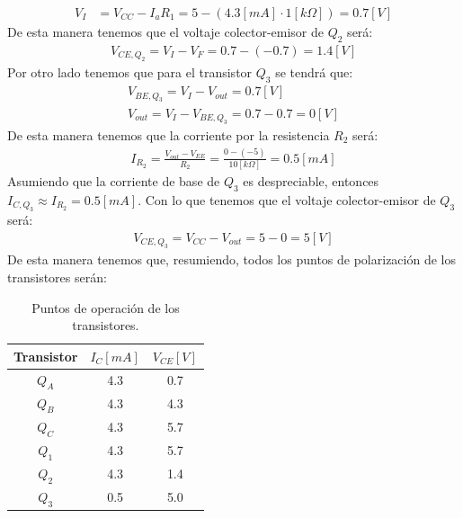 \documentclass[
  11pt,
  letterpaper,
   addpoints,
   answers
  ]{exam}
\begin{document}
\begin{questions}
\begin{parts}
\begin{solution}
\begin{align}
V_{I} &= V_{CC} - I_{a} R_{1} = 5 - (4.3[mA] \cdot 1[k\Omega]) = 0.7[V]
\end{align}
De esta manera tenemos que el voltaje colector-emisor de $Q_2$ será:
\begin{align}
  V_{CE,Q_2} = V_{I} - V_{F} = 0.7 - (-0.7) = 1.4[V]
\end{align}
Por otro lado tenemos que para el transistor $Q_{3}$ se tendrá que:
\begin{align}
  V_{BE,Q_3} = V_{I} - V_{out} = 0.7[V]\\
  V_{out} = V_{I} - V_{BE,Q_3} = 0.7 - 0.7 = 0[V] 
\end{align}
De esta manera tenemos que la corriente por la resistencia $R_{2}$ será:
\begin{align}
  I_{R_2} = \frac{V_{out} - V_{EE}}{R_{2}} = \frac{0 - (-5)}{10[k\Omega]} = 0.5[mA]
\end{align}
Asumiendo que la corriente de base de $Q_3$ es despreciable, entonces $I_{C,Q_3} \approx I_{R_2} = 0.5[mA]$. Con lo que tenemos que el voltaje colector-emisor de $Q_{3}$ será:
\begin{align}
  V_{CE,Q_3} = V_{CC} - V_{out} = 5 - 0 = 5[V]
\end{align}
De esta manera tenemos que, resumiendo, todos los puntos de polarización de los transistores serán:
\begin{table}[H]
\centering
\begin{tabular}{|c|c|c|}
\hline
Transistor & $I_{C}[mA]$ & $V_{CE}[V]$ \\ \hline
$Q_{A}$   & 4.3          & 0.7          \\ \hline
$Q_{B}$   & 4.3          & 4.3          \\ \hline
$Q_{C}$   & 4.3          & 5.7          \\ \hline
$Q_{1}$   & 4.3          & 5.7          \\ \hline
$Q_{2}$   & 4.3          & 1.4          \\ \hline
$Q_{3}$   & 0.5          & 5.0          \\ \hline
\end{tabular}
\caption{Puntos de operación de los transistores.}
\end{table}

\end{solution}

\end{parts}
\end{questions}
\end{document}
